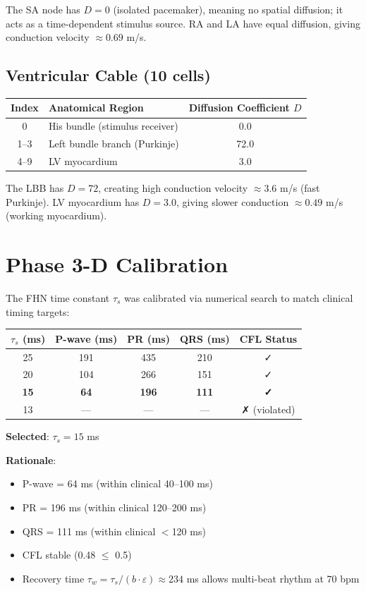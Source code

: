 \documentclass[12pt]{book}
\begin{document}
The SA node has $D=0$ (isolated pacemaker), meaning no spatial diffusion; it acts as a time-dependent stimulus source. RA and LA have equal diffusion, giving conduction velocity $\approx 0.69$ m/s.

\subsection{Ventricular Cable (10 cells)}

\begin{tabular}{|c|l|c|}
\hline
Index & Anatomical Region & Diffusion Coefficient $D$ \\
\hline
0 & His bundle (stimulus receiver) & 0.0 \\
1--3 & Left bundle branch (Purkinje) & 72.0 \\
4--9 & LV myocardium & 3.0 \\
\hline
\end{tabular}

The LBB has $D = 72$, creating high conduction velocity $\approx 3.6$ m/s (fast Purkinje). LV myocardium has $D = 3.0$, giving slower conduction $\approx 0.49$ m/s (working myocardium).

\section{Phase 3-D Calibration}

The FHN time constant $\tau_s$ was calibrated via numerical search to match clinical timing targets:

\begin{tabular}{|c|c|c|c|c|}
\hline
$\tau_s$ (ms) & P-wave (ms) & PR (ms) & QRS (ms) & CFL Status \\
\hline
25 & 191 & 435 & 210 & ✓ \\
20 & 104 & 266 & 151 & ✓ \\
\textbf{15} & \textbf{64} & \textbf{196} & \textbf{111} & \textbf{✓} \\
13 & — & — & — & ✗ (violated) \\
\hline
\end{tabular}

\textbf{Selected}: $\tau_s = 15$ ms

\textbf{Rationale}:
\begin{itemize}
  \item P-wave = 64 ms (within clinical 40--100 ms)
  \item PR = 196 ms (within clinical 120--200 ms)
  \item QRS = 111 ms (within clinical $<$120 ms)
  \item CFL stable (0.48 $\leq$ 0.5)
  \item Recovery time $\tau_w = \tau_s / (b \cdot \varepsilon) \approx 234$ ms allows multi-beat rhythm at 70 bpm
\end{itemize}
\end{document}
